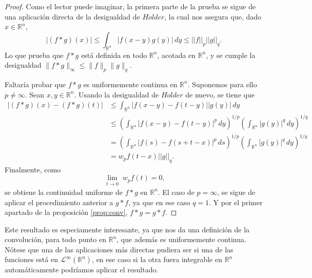 \begin{proof}
    Como el lector puede imaginar, la primera parte de la prueba se sigue de una aplicación directa de la desigualdad de $H\ddot{o}lder$, la cual nos asegura que, dado $x \in \mathbb{R}^n$,
    \begin{equation}
        |(f*g)(x)| \leq \int_{\mathbb{R}^n} |f(x-y)g(y)| \, dy \leq ||f||_p ||g||_q.
    \end{equation}
    Lo que prueba que $f*g$ está definida en todo $\mathbb{R}^n$, acotada en $\mathbb{R}^n$, y se cumple la desigualdad $\|f*g\|_\infty\leq \|f\|_p \|g\|_q.$

\vspace{0.1cm}
\noindent Faltaría probar que $f*g$ es uniformemente continua en $\mathbb{R}^n$.
Suponemos para ello $p\neq \infty$. Sean $x,y \in \mathbb{R}^n$. Usando la desigualdad de $H\ddot{o}lder$ de nuevo, se tiene que
\begin{equation}
\begin{aligned}
    |(f*g)(x)-(f*g)(t)| &\leq \int_{\mathbb{R}^n}|f(x-y)-f(t-y)||g(y)| \, dy \\
    &\leq  \left(\int_{\mathbb{R}^n}|f(x-y)-f(t-y)|^p \, dy \right)^{1/p} \left(\int_{\mathbb{R}^n}|g(y)|^q \, dy\right)^{1/q}
    \\
    &=  \left(\int_{\mathbb{R}^n}|f(s)-f(s+t-x)|^p \, ds \right)^{1/p} \left(\int_{\mathbb{R}^n}|g(y)|^q \, dy\right)^{1/q} 
    \\
    &=w_pf(t-x)||g||_q.
\end{aligned}
\end{equation}
Finalmente, como 
\begin{equation}
    \underset{\substack{t \rightarrow 0}}{\lim}w_pf(t)=0,
\end{equation} 
se obtiene la continuidad uniforme de $f*g$ en $\mathbb{R}^n$.
El caso de $p=\infty$, se sigue de aplicar el procedimiento anterior a $g*f$, ya que en ese caso $q=1$. Y por el primer apartado de la  proposición \ref{prop:conv}, $f*g=g*f$.
\end{proof}
\begin{observacion}
    Este resultado es especiamente interesante, ya que nos da una definición de la convolución, para todo punto en $\mathbb{R}^n$, que además es uniformemente continua. Nótese que una de las aplicaciones más directas pudiera ser si una de las funciones está en $\mathscr{L}^{\infty}(\mathbb{R}^n)$, en ese caso si la otra fuera integrable en $\mathbb{R}^n$ automáticamente podríamos aplicar el resultado.
\end{observacion}

